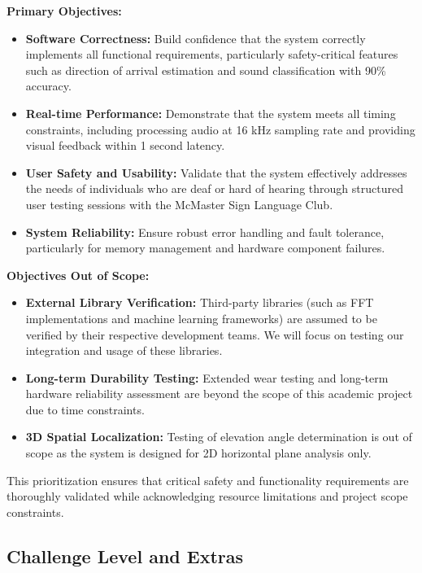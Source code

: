 \documentclass[12pt, titlepage]{article}
\begin{document}
\textbf{Primary Objectives:}
\begin{itemize}
    \item \textbf{Software Correctness:} Build confidence that the system correctly implements all functional requirements, particularly safety-critical features such as direction of arrival estimation and sound classification with 90\% accuracy.
    
    \item \textbf{Real-time Performance:} Demonstrate that the system meets all timing constraints, including processing audio at 16 kHz sampling rate and providing visual feedback within 1 second latency.
    
    \item \textbf{User Safety and Usability:} Validate that the system effectively addresses the needs of individuals who are deaf or hard of hearing through structured user testing sessions with the McMaster Sign Language Club.
    
    \item \textbf{System Reliability:} Ensure robust error handling and fault tolerance, particularly for memory management and hardware component failures.
\end{itemize}

\textbf{Objectives Out of Scope:}
\begin{itemize}
    \item \textbf{External Library Verification:} Third-party libraries (such as FFT implementations and machine learning frameworks) are assumed to be verified by their respective development teams. We will focus on testing our integration and usage of these libraries.
    
    \item \textbf{Long-term Durability Testing:} Extended wear testing and long-term hardware reliability assessment are beyond the scope of this academic project due to time constraints.
        
    \item \textbf{3D Spatial Localization:} Testing of elevation angle determination is out of scope as the system is designed for 2D horizontal plane analysis only.
\end{itemize}

This prioritization ensures that critical safety and functionality requirements are thoroughly validated while acknowledging resource limitations and project scope constraints.

\subsection{Challenge Level and Extras}
\end{document}
